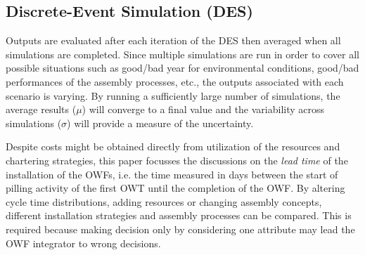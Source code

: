\subsection{Discrete-Event Simulation (DES)}

Outputs are evaluated after each iteration of the DES then averaged when all simulations are completed. Since multiple simulations are run in order to cover all possible situations such as good/bad year for environmental conditions, good/bad performances of the assembly processes, etc., the outputs associated with each scenario is varying. By running a sufficiently large number of simulations, the average results ($\mu$) will converge to a final value and the variability across simulations ($\sigma$) will provide a measure of the uncertainty.

Despite costs might be obtained directly from utilization of the resources and chartering strategies, this paper focusses the discussions on the \textit{lead time} of the installation of the OWFs, i.e. the time measured in days between the start of pilling activity of the first OWT until the completion of the OWF. By altering cycle time distributions, adding resources or changing assembly concepts, different installation strategies and assembly processes can be compared. This is required because making decision only by considering one attribute may lead the OWF integrator to wrong decisions.

